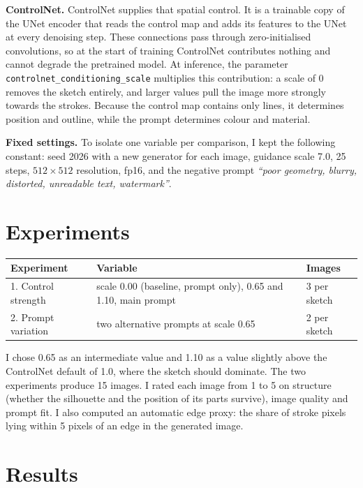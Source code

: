 \documentclass[10pt,a4paper]{article}
\begin{document}
\textbf{ControlNet.} ControlNet supplies that spatial control. It is a trainable copy of the UNet encoder that reads the control map and adds its features to the UNet at every denoising step. These connections pass through zero-initialised convolutions, so at the start of training ControlNet contributes nothing and cannot degrade the pretrained model. At inference, the parameter \texttt{controlnet\_conditioning\_scale} multiplies this contribution: a scale of 0 removes the sketch entirely, and larger values pull the image more strongly towards the strokes. Because the control map contains only lines, it determines position and outline, while the prompt determines colour and material.

\textbf{Fixed settings.} To isolate one variable per comparison, I kept the following constant: seed 2026 with a new generator for each image, guidance scale 7.0, 25 steps, $512\times512$ resolution, fp16, and the negative prompt \emph{``poor geometry, blurry, distorted, unreadable text, watermark''}.

\section{Experiments}

\begin{table}[H]
  \centering\small
  \begin{tabular}{@{}lll@{}}
    \toprule
    Experiment & Variable & Images \\
    \midrule
    1. Control strength & scale 0.00 (baseline, prompt only), 0.65 and 1.10, main prompt & 3 per sketch \\
    2. Prompt variation & two alternative prompts at scale 0.65 & 2 per sketch \\
    \bottomrule
  \end{tabular}
\end{table}

I chose 0.65 as an intermediate value and 1.10 as a value slightly above the ControlNet default of 1.0, where the sketch should dominate. The two experiments produce 15 images. I rated each image from 1 to 5 on structure (whether the silhouette and the position of its parts survive), image quality and prompt fit. I also computed an automatic edge proxy: the share of stroke pixels lying within 5 pixels of an edge in the generated image.

\section{Results}
\end{document}
